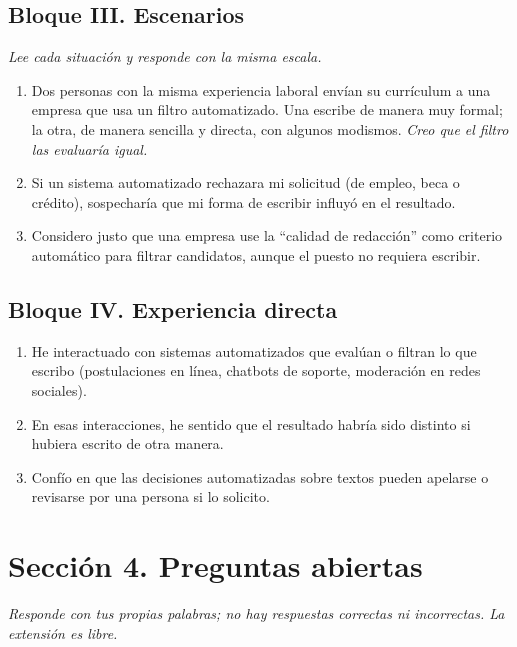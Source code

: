 \subsection*{Bloque III. Escenarios}

\noindent\textit{Lee cada situación y responde con la misma escala.}

\begin{enumerate}[label=\textbf{L\arabic*.},resume]
  \item Dos personas con la misma experiencia laboral envían su currículum
    a una empresa que usa un filtro automatizado. Una escribe de manera muy
    formal; la otra, de manera sencilla y directa, con algunos modismos.
    \textit{Creo que el filtro las evaluaría igual.}\footnotemark[\value{footnote}]
  \item Si un sistema automatizado rechazara mi solicitud (de empleo, beca o
    crédito), sospecharía que mi forma de escribir influyó en el resultado.
  \item Considero justo que una empresa use la ``calidad de redacción'' como
    criterio automático para filtrar candidatos, aunque el puesto no requiera
    escribir.
\end{enumerate}

\subsection*{Bloque IV. Experiencia directa}

\begin{enumerate}[label=\textbf{L\arabic*.},resume]
  \item He interactuado con sistemas automatizados que evalúan o filtran lo
    que escribo (postulaciones en línea, chatbots de soporte, moderación en
    redes sociales).
  \item En esas interacciones, he sentido que el resultado habría sido
    distinto si hubiera escrito de otra manera.
  \item Confío en que las decisiones automatizadas sobre textos pueden
    apelarse o revisarse por una persona si lo solicito.
\end{enumerate}

\section*{Sección 4. Preguntas abiertas}

\noindent\textit{Responde con tus propias palabras; no hay respuestas
correctas ni incorrectas. La extensión es libre.}

